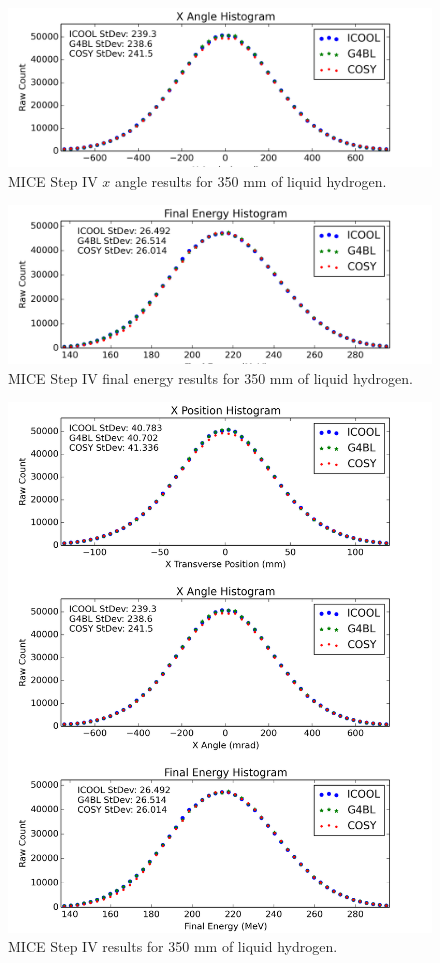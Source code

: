 \documentclass[a4paper,11pt]{article}
\begin{document}
\begin{figure}[htb]
  \centering
    \includegraphics[width=\columnwidth]{px} 
  \caption{MICE Step IV $x$ angle results for 350 mm of liquid hydrogen.}
  \label{fig:micexangle}
\end{figure}

\begin{figure}[htb]
  \centering
    \includegraphics[width=\columnwidth]{e} 
  \caption{MICE Step IV final energy results for 350 mm of liquid hydrogen.}
  \label{fig:miceenergy}
\end{figure}
\fi

\begin{figure}[!ht]
  \centering
    \includegraphics[width=0.7\columnwidth]{MICE_LH} 
  \caption{MICE Step IV results for 350 mm of liquid hydrogen.}
  \label{fig:mice_lh}
\end{figure}
\end{document}
